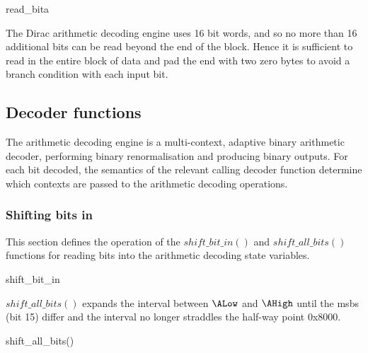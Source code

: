 \begin{pseudo}{read\_bita}{}
\bsELSE
\bsEND
\end{pseudo}

\begin{informative}
The Dirac arithmetic decoding engine uses 16 bit words, and so no more than 16
additional bits can be read beyond the end of the block. Hence it is sufficient
to read in the entire block of data and pad the end with two zero bytes to
avoid a branch condition with each input bit.
\end{informative}

\subsection{Decoder functions}
\label{extractarith}
The arithmetic decoding engine is a multi-context, adaptive binary
arithmetic decoder, performing binary renormalisation and producing
binary outputs. For each bit decoded, the semantics of the relevant
calling decoder function determine which contexts are passed to the
arithmetic decoding operations.

\subsubsection{Shifting bits in}

\label{arithshiftin}

This section defines the operation of the $shift\_bit\_in()$ 
and $shift\_all\_bits()$ functions
for reading bits into the arithmetic decoding state variables.

\begin{pseudo}{shift\_bit\_in}{}
\end{pseudo}

$shift\_all\_bits()$ expands the interval between $\ALow$ and $\AHigh$
until the msbs (bit 15) differ and the interval no longer
straddles the half-way point 0x8000.

\begin{pseudo}{shift\_all\_bits()}{}
\bsEND
{}
\bsEND
\end{pseudo}

